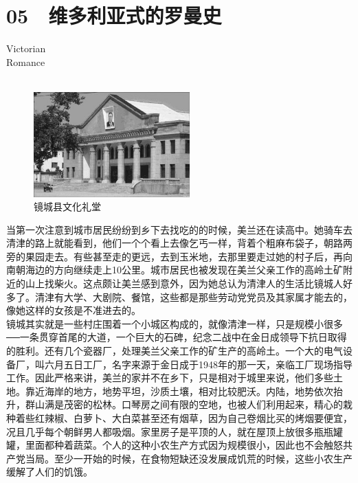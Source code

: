 \fancyhead[RO]{{\tiny{\textcolor{Gray}{\FA \ }}}\thepage}
\fancyhead[LE]{{\tiny{\textcolor{Gray}{\FA \ }}}\thepage}
\fancyfoot[LE,RO]{}
\fancyfoot[LO,CE]{}
\fancyfoot[CO,RE]{}
\chapter*{05 {\FA } 维多利亚式的罗曼史}
\begin{flushright}
	\textcolor{PinYinColor}{\EN \huge{Victorian\\
		Romance\\
	\ \\}}
\end{flushright}
\begin{figure}[!htbp]
	\centering
	\includegraphics[width=6cm]{./Chapters/Images/05.jpg}
	\caption*{镜城县文化礼堂}
\end{figure}


当第一次注意到城市居民纷纷到乡下去找吃的的时候，美兰还在读高中。她骑车去清津的路上就能看到，他们一个个看上去像乞丐一样，背着个粗麻布袋子，朝路两旁的果园走去。有些甚至走的更远，去到玉米地，去那里要走过她的村子后，再向南朝海边的方向继续走上10公里。城市居民也被发现在美兰父亲工作的高岭土矿附近的山上找柴火。这点颇让美兰感到意外，因为她总认为清津人的生活比镜城人好多了。清津有大学、大剧院、餐馆，这些都是那些劳动党党员及其家属才能去的，像她这样的女孩是不准进去的。\\

镜城其实就是一些村庄围着一个小城区构成的，就像清津一样，只是规模小很多──一条贯穿首尾的大道，一个巨大的石碑，纪念二战中在金日成领导下抗日取得的胜利。还有几个瓷器厂，处理美兰父亲工作的矿生产的高岭土。一个大的电气设备厂，叫六月五日工厂，名字来源于金日成于1948年的那一天，亲临工厂现场指导工作。因此严格来讲，美兰的家并不在乡下，只是相对于城里来说，他们多些土地。靠近海岸的地方，地势平坦，沙质土壤，相对比较肥沃。内陆，地势依次抬升，群山满是茂密的松林。口琴房之间有限的空地，也被人们利用起来，精心的栽种着些红辣椒、白萝卜、大白菜甚至还有烟草，因为自己卷烟比买的烤烟要便宜，况且几乎每个朝鲜男人都吸烟。家里房子是平顶的人，就在屋顶上放很多瓶瓶罐罐，里面都种着蔬菜。个人的这种小农生产方式因为规模很小，因此也不会触怒共产党当局。至少一开始的时候，在食物短缺还没发展成饥荒的时候，这些小农生产缓解了人们的饥饿。\\


